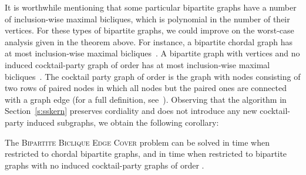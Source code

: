 It is worthwhile mentioning that some particular bipartite
graphs have a number of inclusion-wise maximal bicliques, which
is polynomial in the number of their vertices. For these types
of bipartite graphs, we could improve on the worst-case analysis
given in the theorem above. For instance, a bipartite chordal
graph  has at most  inclusion-wise maximal
bicliques~\cite{TsukiyamaIdeAriyoshiShirakawa1977}. A bipartite
graph with  vertices and no induced cocktail-party graph of
order  has at
most  inclusion-wise maximal
bicliques~\cite{Prisner2000}. The cocktail party graph of order 
is the graph with nodes consisting of two rows of paired nodes in which all nodes but the paired ones are connected with a graph edge
(for a full definition, see~\cite{Prisner2000}). Observing that the algorithm in
Section~\ref{s:sskern} preserves cordiality and does not
introduce any new cocktail-party induced subgraphs, we obtain
the following corollary:

\begin{corollary}
The \textsc{Bipartite Biclique Edge Cover} problem can be
solved in  time when restricted to
chordal bipartite graphs, and in 
time when restricted to bipartite graphs with no induced
cocktail-party graphs of order .
\end{corollary}
